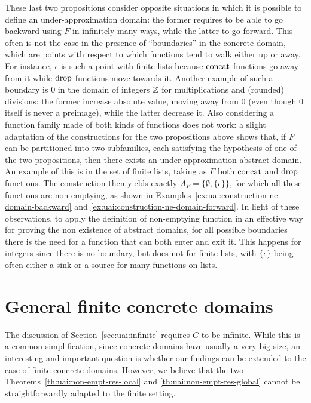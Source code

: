 These last two propositions consider opposite situations in which it is possible to define an under-approximation domain: the former requires to be able to go backward using $F$ in infinitely many ways, while the latter to go forward. This often is not the case in the presence of ``boundaries'' in the concrete domain, which are points with respect to which functions tend to walk either up or away. For instance, $\epsilon$ is such a point with finite lists because $\text{concat}$ functions go away from it while $\text{drop}$ functions move towards it.
Another example of such a boundary is $0$ in the domain of integers $\mathbb{Z}$ for multiplications and (rounded) divisions: the former increase absolute value, moving away from $0$ (even though $0$ itself is never a preimage), while the latter decrease it.
Also considering a function family made of both kinds of functions does not work: a slight adaptation of the constructions for the two propositions above shows that, if $F$ can be partitioned into two subfamilies, each satisfying the hypothesis of one of the two propositions, then there exists an under-approximation abstract domain. An example of this is in the set of finite lists, taking as $F$ both $\text{concat}$ and $\text{drop}$ functions. The construction then yields exactly $A_F = \{ \emptyset, \{ \epsilon \} \}$, for which all these functions are non-emptying, as shown in Examples~\ref{ex:uai:construction-ne-domain-backward} and \ref{ex:uai:construction-ne-domain-forward}.
In light of these observations, to apply the definition of non-emptying function in an effective way for proving the non existence of abstract domains, for all possible boundaries there is the need for a function that can both enter and exit it. This happens for integers since there is no boundary, but does not for finite lists, with $\{ \epsilon \}$ being often either a sink or a source for many functions on lists.

\section{General finite concrete domains}\label{sec:uai:finite}
The discussion of Section~\ref{sec:uai:infinite} requires $C$ to be infinite. While this is a common simplification, since concrete domains have usually a very big size, an interesting and important question is whether our findings can be extended to the case of finite concrete domains.
However, we believe that the two Theorems~\ref{th:uai:non-empt-res-local} and \ref{th:uai:non-empt-res-global} cannot be straightforwardly adapted to the finite setting.

